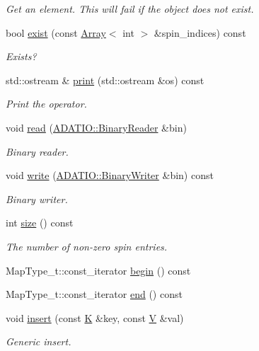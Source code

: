 \begin{DoxyCompactItemize}
\begin{DoxyCompactList}\small\item\em Get an element. This will fail if the object does not exist. \end{DoxyCompactList}\item 
bool \mbox{\hyperlink{classHadron_1_1HadronDistOperatorRep__t_aac19d4174b14052f09070df85c789d43}{exist}} (const \mbox{\hyperlink{classXMLArray_1_1Array}{Array}}$<$ int $>$ \&spin\+\_\+indices) const
\begin{DoxyCompactList}\small\item\em Exists? \end{DoxyCompactList}\item 
std\+::ostream \& \mbox{\hyperlink{classHadron_1_1HadronDistOperatorRep__t_af1744e95c70a52b3f1706d62b4298a7e}{print}} (std\+::ostream \&os) const
\begin{DoxyCompactList}\small\item\em Print the operator. \end{DoxyCompactList}\item 
void \mbox{\hyperlink{classHadron_1_1HadronDistOperatorRep__t_a17387b2569f243bf0aecc9c6f4160051}{read}} (\mbox{\hyperlink{classADATIO_1_1BinaryReader}{A\+D\+A\+T\+I\+O\+::\+Binary\+Reader}} \&bin)
\begin{DoxyCompactList}\small\item\em Binary reader. \end{DoxyCompactList}\item 
void \mbox{\hyperlink{classHadron_1_1HadronDistOperatorRep__t_a13c4b6d851e65136c55ccee152e72a12}{write}} (\mbox{\hyperlink{classADATIO_1_1BinaryWriter}{A\+D\+A\+T\+I\+O\+::\+Binary\+Writer}} \&bin) const
\begin{DoxyCompactList}\small\item\em Binary writer. \end{DoxyCompactList}\item 
int \mbox{\hyperlink{classHadron_1_1HadronDistOperatorRep__t_aa29061d2a7319319dd6ea0a918acd8db}{size}} () const
\begin{DoxyCompactList}\small\item\em The number of non-\/zero spin entries. \end{DoxyCompactList}\item 
Map\+Type\+\_\+t\+::const\+\_\+iterator \mbox{\hyperlink{classHadron_1_1HadronDistOperatorRep__t_af2f649024c217a2e43643a096c7bd512}{begin}} () const
\item 
Map\+Type\+\_\+t\+::const\+\_\+iterator \mbox{\hyperlink{classHadron_1_1HadronDistOperatorRep__t_a5619645b5dc3bfb3ab0f15cebe15ecf6}{end}} () const
\item 
void \mbox{\hyperlink{classHadron_1_1HadronDistOperatorRep__t_a05856fbd2f2205ddc461685d987713b9}{insert}} (const \mbox{\hyperlink{classHadron_1_1HadronDistOperatorRep__t_a670c7409bfd80616aeb0159590bcdb6b}{K}} \&key, const \mbox{\hyperlink{classHadron_1_1HadronDistOperatorRep__t_a40f37383ae57b1d0bbf944d698a10382}{V}} \&val)
\begin{DoxyCompactList}\small\item\em Generic insert. \end{DoxyCompactList}\end{DoxyCompactItemize}
